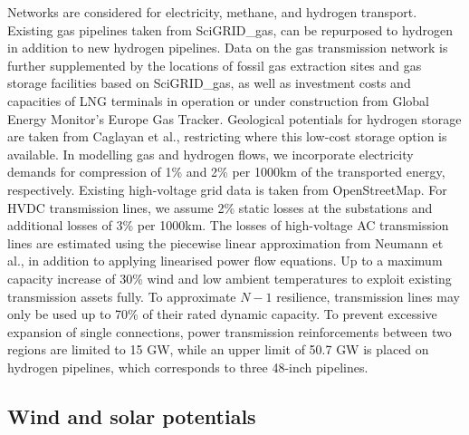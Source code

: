 Networks are considered for electricity, methane, and hydrogen transport.
Existing gas pipelines taken from SciGRID\_gas,\cite{plutaSciGRIDGas2022a} can
be repurposed to hydrogen in addition to new hydrogen
pipelines.\cite{neumannPotentialRoleHydrogen2023} Data on the gas transmission
network is further supplemented by the locations of fossil gas extraction sites
and gas storage facilities based on SciGRID\_gas,\cite{plutaSciGRIDGas2022a} as
well as investment costs and capacities of LNG terminals in operation or under
construction from Global Energy Monitor's Europe Gas
Tracker.\cite{globalenergymonitorEuropeGasTracker2024} Geological potentials for
hydrogen storage are taken from Caglayan et
al.,\cite{caglayanTechnicalPotentialSalt2020} restricting where this low-cost
storage option is available. In modelling gas and hydrogen flows, we incorporate
electricity demands for compression of 1\% and 2\% per 1000km of the transported
energy, respectively.\cite{gasforclimateEuropeanHydrogen2021} Existing
high-voltage grid data is taken from
OpenStreetMap.\cite{xiongModellingHighVoltageGrid2024} For HVDC transmission
lines, we assume 2\% static losses at the substations and additional losses of
3\% per 1000km. The losses of high-voltage AC transmission lines are estimated
using the piecewise linear approximation from Neumann et
al.,\cite{neumannAssessmentsLinear2022} in addition to applying linearised power
flow equations.\cite{horschLinearOptimal2018} Up to a maximum capacity increase
of 30\%
wind and low ambient temperatures to exploit existing transmission assets
fully.\cite{glaumLeveragingExisting2023} To approximate $N-1$ resilience,
transmission lines may only be used up to 70\% of their rated dynamic
capacity.\cite{shokrigazafroudiTopologybasedApproximations12022} To prevent
excessive expansion of single connections, power transmission reinforcements
between two regions are limited to 15 GW, while an upper limit of 50.7 GW is
placed on hydrogen pipelines, which corresponds to three 48-inch
pipelines.\cite{gasforclimateEuropeanHydrogen2021}

\subsection*{Wind and solar potentials}
\label{sec:methods-wind-solar}

